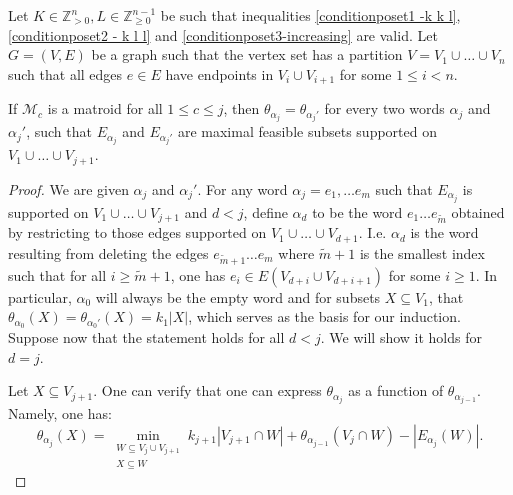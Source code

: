 \documentclass{article}
\begin{document}
\begin{lemma}
    Let $K\in \mathbb{Z}_{>0}^{n}, L\in \mathbb{Z}_{\geq 0}^{n-1}$ be such that inequalities \eqref{conditionposet1 -k k l}, \eqref{conditionposet2 - k l l} and \eqref{conditionposet3-increasing} are valid. Let $G=(V,E)$ be a graph such that the vertex set has a partition $V=V_1\cup \dots \cup V_n$ such that all edges $e\in E$ have endpoints in $V_{i} \cup V_{i+1}$ for some $1 \leq i < n$. 
    
    If $\mathcal{M}_c$ is a matroid for all $1 \leq c\leq j$, then $\theta_{\alpha_j} = \theta_{\alpha_j'}$ for every two words $\alpha_j$ and $\alpha_j'$, such that $E_{\alpha_j}$ and $E_{\alpha_j'}$ are maximal feasible subsets supported on $V_1\cup \dots \cup V_{j+1}$. 
    \label{surplus-independent}
\end{lemma}
\begin{proof}
We are given $\alpha_j$ and $\alpha_j'$. For any word $\alpha_j = e_1, \dots e_m$ such that $E_{\alpha_j}$ is supported on $V_1\cup \dots \cup V_{j+1}$ and $d<j$, define $\alpha_{d}$ to be the word $e_1 \dots e_{\tilde{m}}$ obtained by restricting to those edges supported on $V_1\cup \dots \cup V_{d+1}$. I.e. $\alpha_{d}$ is the word resulting from deleting the edges $e_{\tilde{m}+1}\dots e_{m}$ where $\tilde{m}+1$ is the smallest index such that for all $i\geq \tilde{m}+1$, one has $e_{i} \in E(V_{d+i}\cup V_{d+i+1})$ for some $i \geq 1$. In particular, $\alpha_{0}$ will always be the empty word and for subsets $X\subseteq V_1$, that $\theta_{\alpha_0}(X) = \theta_{\alpha_0'}(X) = k_1|X|$, which serves as the basis for our induction. Suppose now that the statement holds for all $d < j$. We will show it holds for $d=j$.

Let $X\subseteq V_{j+1}$. One can verify that one can express $\theta_{\alpha_{j}}$ as a function of $\theta_{\alpha_{j-1}}$. Namely, one has:
\begin{equation*}
    \theta_{\alpha_j}(X)= \min_{\substack{W\subseteq V_{j} \cup V_{j+1}\\[2pt] X\subseteq W}}  k_{j+1}|V_{j+1} \cap W| +\theta_{\alpha_{j-1}}(V_{j}\cap W)  -|E_{\alpha_j}(W)|.
\end{equation*}



\end{proof}
\end{document}

